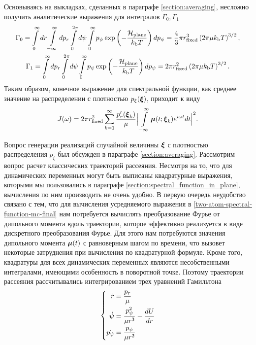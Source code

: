 Основываясь на выкладках, сделанных в параграфе \ref{section:averaging}, несложно получить аналитические выражения для интегралов $\Gamma_0, \Gamma_1$
\begin{gather}
    \Gamma_0 = \int\limits_0^\infty dr \int\limits_{-\infty}^\infty dp_r \int\limits_0^{2\pi} d\psi \int\limits_0^\infty p_\psi \exp \left( -\frac{\mathcal{H}_\text{plane}}{k_\text{b} T} \right) d p_\psi = \frac{4}{3} \pi r_\text{fixed}^3 \left( 2 \pi \mu k_\text{b} T \right)^{3/2}, \\
    \Gamma_1 = \int\limits_0^\infty dp_r \int\limits_0^{2\pi} d\psi \int\limits_0^\infty p_\psi \exp \left( -\frac{\mathcal{H}_\text{plane}}{k_\text{b} T} \right) dp_\psi  = 2 \pi r_\text{fixed}^2 \left( 2 \pi \mu k_\text{b} T \right)^{3/2}.
\end{gather}
Таким образом, конечное выражение для спектральной функции, как среднее значение на распределении с плотностью $p_\xi(\boldsymbol{\xi})$, приходит к виду
\begin{gather}
    J(\omega) = 2 \pi r_\text{fixed}^2 \sum_{k = 1}^\infty \frac{p_r^\prime(\boldsymbol{\xi}_k)}{\mu} \Big\vert \int\limits_{-\infty}^\infty \boldsymbol{\mu}(t; \boldsymbol{\xi}_k) e^{i \omega t} dt \Big\vert^2. \label{two-atom-spectral-function-mc-final}
\end{gather}

Вопрос генерации реализаций случайной величины $\boldsymbol{\xi}$ с плотностью распределения $p_\xi$ был обсужден в параграфе \ref{section:averaging}. Рассмотрим вопрос расчет классических траекторий рассеяния. Несмотря на то, что для динамических переменных могут быть выписаны квадратурные выражения, которыми мы пользовались в параграфе \ref{section:spectral_function_in_plane}, вычисления по ним производить не очень удобно. В первую очередь неудобство связано с тем, что для вычисления усредняемого выражения в \eqref{two-atom-spectral-function-mc-final} нам потребуется вычислять преобразование Фурье от дипольного момента вдоль траектории, которое эффективно реализуется в виде дискретного преобразования Фурье. Для этого нам потребуются значения дипольного момента $\boldsymbol{\mu}(t)$ с равноверным шагом по времени, что вызовет некоторые затруднения при вычисления по квадратурной формуле. Кроме того, квадратуры для всех динамических переменных являются несобственными интегралами, имеющими особенность в поворотной точке. Поэтому траектории рассеяния рассчитывались интегрированием трех уравнений Гамильтона
\begin{gather}
    \left\{
    \begin{aligned}
        \dot{r} &= \frac{p_r}{\mu} \\
        \dot{\psi} &= \frac{p_\psi^2}{\mu r^3} - \frac{d U}{d r} \\
        \dot{p_\psi} &= \frac{p_\psi}{\mu r^2}
    \end{aligned}
    \right. \label{two-atom-hamilton-equations}
\end{gather}

